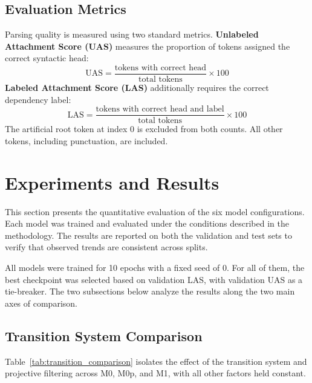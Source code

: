 \documentclass[12pt,letterpaper]{article}
\begin{document}
\FloatBarrier


\subsection{Evaluation Metrics}
\label{subsec:evaluation_metrics}

Parsing quality is measured using two standard metrics. \textbf{Unlabeled Attachment Score (UAS)} measures the proportion of tokens assigned the correct syntactic head:
\begin{equation}
\text{UAS} = \frac{\text{tokens with correct head}}{\text{total tokens}} \times 100
\end{equation}
\textbf{Labeled Attachment Score (LAS)} additionally requires the correct dependency label:
\begin{equation}
\text{LAS} = \frac{\text{tokens with correct head and label}}{\text{total tokens}} \times 100
\end{equation}
The artificial root token at index 0 is excluded from both counts. All other tokens, including punctuation, are included.


\section{Experiments and Results}
\label{sec:experiments_results}

This section presents the quantitative evaluation of the six model configurations. Each model was trained and evaluated under the conditions described in the methodology. The results are reported on both the validation and test sets to verify that observed trends are consistent across splits.

All models were trained for 10 epochs with a fixed seed of 0. For all of them, the best checkpoint was selected based on validation LAS, with validation UAS as a tie-breaker. The two subsections below analyze the results along the two main axes of comparison.

\subsection{Transition System Comparison}
\label{subsec:transition_comparison}

Table~\ref{tab:transition_comparison} isolates the effect of the transition system and projective filtering across M0, M0p, and M1, with all other factors held constant.
\end{document}
